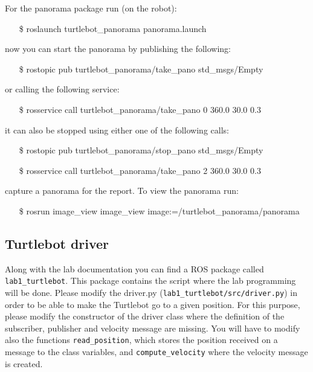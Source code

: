 \documentclass[a4paper,10pt]{article}
\begin{document}
For the panorama package run (on the robot):
\begin{shaded}
	\begin{itemize}
		\item[\$] roslaunch turtlebot\_panorama panorama.launch
	\end{itemize}
\end{shaded}
now you can start the panorama by publishing the following:
\begin{shaded}
	\begin{itemize}
		\item[\$] rostopic pub turtlebot\_panorama/take\_pano std\_msgs/Empty
	\end{itemize}
\end{shaded}
or calling the following service:
\begin{shaded}
	\begin{itemize}
		\item[\$] rosservice call turtlebot\_panorama/take\_pano 0 360.0 30.0 0.3
	\end{itemize}
\end{shaded}
it can also be stopped using either one of the following calls:
\begin{shaded}
	\begin{itemize}
		\item[\$] rostopic pub turtlebot\_panorama/stop\_pano std\_msgs/Empty
		\item[\$] rosservice call turtlebot\_panorama/take\_pano 2 360.0 30.0 0.3
	\end{itemize}
\end{shaded}
capture a panorama for the report. To view the panorama run:
\begin{shaded}
	\begin{itemize}
		\item[\$] rosrun image\_view image\_view image:=/turtlebot\_panorama/panorama
	\end{itemize}
\end{shaded}

\subsection{Turtlebot driver}
Along with the lab documentation you can find a ROS package called \texttt{lab1\_turtlebot}. This package contains the script where the lab programming will be done. Please modify the driver.py (\texttt{lab1\_turtlebot/src/driver.py}) in order to be able to make the Turtlebot go to a given position. For this purpose, please modify the constructor of the driver class where the definition of the subscriber, publisher and velocity message are missing. You will have to modify also the functions \texttt{read\_position}, which stores the position received on a message to the class variables, and \texttt{compute\_velocity} where the velocity message is created.
\end{document}
